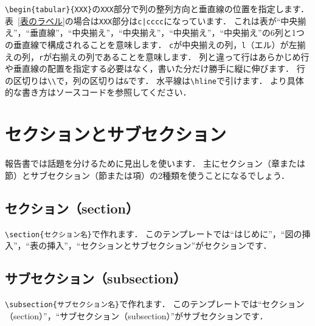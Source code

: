 \documentclass[10pt,a4j,twocolumn]{ltjsarticle}
\begin{document}
\verb|\begin{tabular}{XXX}|の\verb|XXX|部分で列の整列方向と垂直線の位置を指定します．
表~\ref{表のラベル}の場合は\verb|XXX|部分は\verb=c|cccc=になっています．
これは表が``中央揃え''，``垂直線''，``中央揃え''，``中央揃え''，``中央揃え''，``中央揃え''の6列と1つの垂直線で構成されることを意味します．
\verb|c|が中央揃えの列，\verb|l|（エル）が左揃えの列，\verb|r|が右揃えの列であることを意味します．
列と違って行はあらかじめ行や垂直線の配置を指定する必要はなく，書いた分だけ勝手に縦に伸びます．
行の区切りは\verb|\\|で，列の区切りは\verb|&|です．
水平線は\verb|\hline|で引けます．
より具体的な書き方はソースコードを参照してください．

\section{セクションとサブセクション}

報告書では話題を分けるために見出しを使います．
主にセクション（章または節）とサブセクション（節または項）の2種類を使うことになるでしょう．

\subsection{セクション（section）}

\verb|\section{セクション名}|で作れます．
このテンプレートでは``はじめに''，``図の挿入''，``表の挿入''，``セクションとサブセクション''がセクションです．

\subsection{サブセクション（subsection）}

\verb|\subsection{サブセクション名}|で作れます．
このテンプレートでは``セクション（section）''，``サブセクション（subsection）''がサブセクションです．
\end{document}
